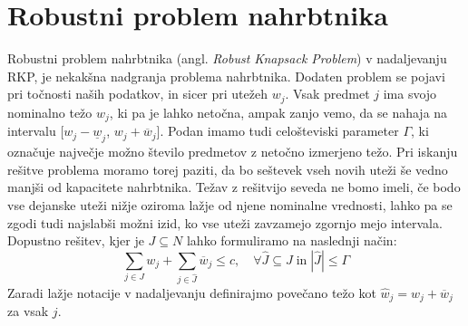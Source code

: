 \documentclass[a4paper,12pt]{article}
\theoremstyle{definition}
\begin{document}
\section{Robustni problem nahrbtnika}
\medskip
Robustni problem nahrbtnika (angl. \textit{Robust Knapsack Problem}) v nadaljevanju 
RKP, je nekakšna nadgranja problema nahrbtnika. Dodaten problem se pojavi pri točnosti 
naših podatkov, in sicer pri utežeh $w_{j}$. Vsak predmet $j$ ima svojo nominalno težo 
$w_{j}$, ki pa je lahko netočna, ampak zanjo vemo, da se nahaja na intervalu 
[$w_{j} - \underline{w}_{j}$, $w_{j} + \overline{w}_{j}$]. Podan imamo tudi celošteviski parameter $\Gamma$,
ki označuje največje možno število predmetov z netočno izmerjeno težo. Pri iskanju 
rešitve problema moramo torej paziti, da bo seštevek vseh novih uteži še vedno manjši od
kapacitete nahrbtnika. Težav z rešitvijo seveda ne bomo imeli, če bodo vse dejanske uteži
nižje oziroma lažje od njene nominalne vrednosti, lahko pa se zgodi tudi najslabši možni 
izid, ko vse uteži zavzamejo zgornjo mejo intervala. Dopustno rešitev, kjer je
$J \subseteq N$ lahko formuliramo na naslednji način: 
\begin{equation}
    \tag*{}
    \sum_{j \in J}w_{j} + \sum_{j \in \hat{J}}\overline{w}_{j} \leq c,\quad \forall \hat{J} \subseteq J \; \text{in}\; |\hat{J}| \leq \Gamma 
\end{equation}
Zaradi lažje notacije v nadaljevanju definirajmo povečano težo kot $\hat{w}_j = w_j + \overline{w}_{j}$ za vsak $j$.
\end{document}
